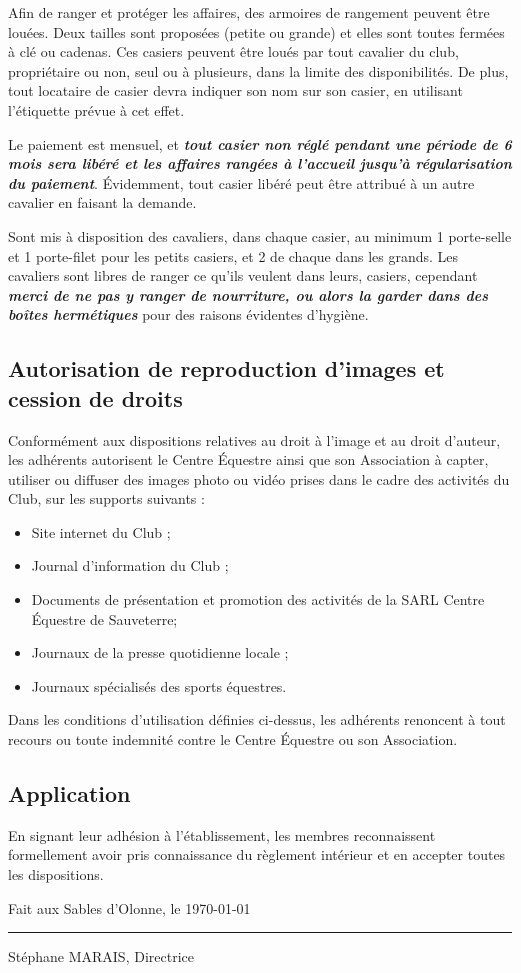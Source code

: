 \documentclass[11pt,a4paper]{article}
\begin{document}
Afin de ranger et protéger les affaires, des armoires de rangement peuvent être louées.
Deux tailles sont proposées (petite ou grande) et elles sont toutes fermées à clé ou cadenas.
Ces \og casiers \fg{} peuvent être loués par tout cavalier du club, propriétaire ou non, seul ou à plusieurs, dans la limite des disponibilités.
De plus, tout locataire de casier devra indiquer son nom sur son casier, en utilisant l'étiquette prévue à cet effet.

Le paiement est mensuel, et \textit{\textbf{tout casier non réglé pendant une période de 6 mois sera libéré et les affaires rangées à l'accueil jusqu'à régularisation du paiement}}.
Évidemment, tout casier libéré peut être attribué à un autre cavalier en faisant la demande.

Sont mis à disposition des cavaliers, dans chaque casier, au minimum 1 porte-selle et 1 porte-filet pour les petits casiers, et 2 de chaque dans les grands.
Les cavaliers sont libres de ranger ce qu'ils veulent dans leurs, casiers, cependant \textit{\textbf{merci de ne pas y ranger de nourriture, ou alors la garder dans des boîtes hermétiques}} pour des raisons évidentes d'hygiène.

\subsection{Autorisation de reproduction d'images et cession de droits}
Conformément aux dispositions relatives au droit à l'image et au droit d'auteur, les adhérents autorisent le Centre Équestre ainsi que son Association à capter, utiliser ou diffuser des images photo ou vidéo prises dans le cadre des activités du Club, sur les supports suivants :
\begin{itemize}
\item
Site internet du Club ;
\item
Journal d'information du Club ;
\item
Documents de présentation et promotion des activités de la SARL Centre Équestre de Sauveterre;
\item
Journaux de la presse quotidienne locale ;
\item
Journaux spécialisés des sports équestres.
\end{itemize}
Dans les conditions d'utilisation définies ci-dessus, les adhérents renoncent à tout recours ou toute indemnité contre le Centre Équestre ou son Association.

\subsection{Application}
En signant leur adhésion à l'établissement, les membres reconnaissent formellement avoir pris connaissance du règlement intérieur et en accepter toutes les dispositions.

\vfill

Fait aux Sables d'Olonne, le \today

\vspace{2cm}

\begin{flushright}
\rule{6cm}{0.5pt}

{Stéphane MARAIS, Directrice \kern 9pt}

\end{flushright}
\end{document}
